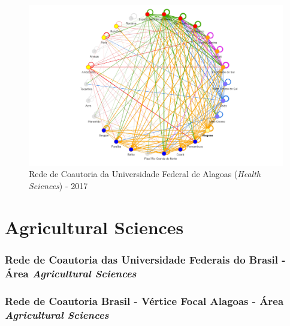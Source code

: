 \begin{figure}[H]
	\centering
	\includegraphics[width=\linewidth]{Imagens/rede-al-2017.pdf}
	\caption{Rede de Coautoria da Universidade Federal de Alagoas (\textit{Health Sciences}) - 2017}
	\label{Rede de Coautoria - UF AL 2017}
\end{figure}




\section{\textbf{Agricultural Sciences}}

\subsubsection{Rede de Coautoria das Universidade Federais do Brasil - Área \textit{Agricultural Sciences}}

\subsubsection{Rede de Coautoria Brasil - Vértice Focal Alagoas - Área \textit{Agricultural Sciences}}



